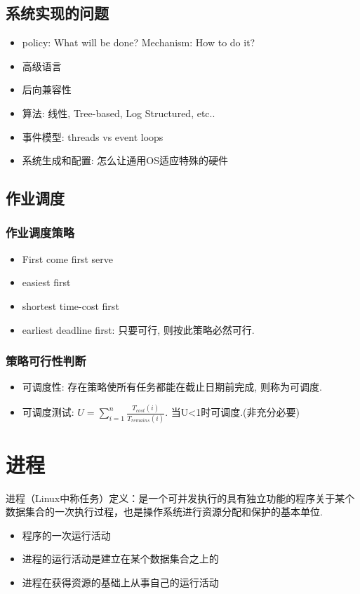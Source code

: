 \documentclass[a4paper, UTF8]{article}
\begin{document}
\subsection{系统实现的问题}
\begin{itemize}
\item policy: What will be done? Mechanism: How to do it?
\item 高级语言
\item 后向兼容性
\item 算法: 线性, Tree-based, Log Structured, etc..
\item 事件模型: threads vs event loops
\item 系统生成和配置: 怎么让通用OS适应特殊的硬件
\end{itemize}

\subsection{作业调度}
\subsubsection{作业调度策略}
\begin{itemize}
\item First come first serve
\item easiest first
\item shortest time-cost first
\item earliest deadline first: 只要可行, 则按此策略必然可行.
\end{itemize}
\subsubsection{策略可行性判断}
\begin{itemize}
\item 可调度性: 存在策略使所有任务都能在截止日期前完成, 则称为可调度.
\item 可调度测试: $U=\sum\limits_{i=1}^n\frac{T_{cost}(i)}{T_{remains}(i)}$. 当U<1时可调度.(非充分必要)
\end{itemize}
\newpage
\section{进程}
进程（Linux中称任务）定义：是一个可并发执行的具有独立功能的程序关于某个数据集合的一次执行过程，也是操作系统进行资源分配和保护的基本单位.
\begin{itemize}
\item 程序的一次运行活动
\item 进程的运行活动是建立在某个数据集合之上的
\item 进程在获得资源的基础上从事自己的运行活动
\end{itemize}
\end{document}
